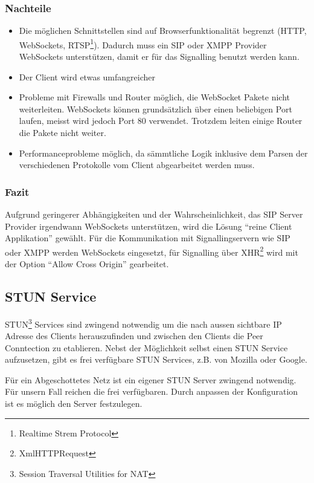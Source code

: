 		\subsubsection{Nachteile}
		\begin{itemize}
			\item Die möglichen Schnittstellen sind auf Browserfunktionalität begrenzt (HTTP, WebSockets, RTSP\footnote{Realtime Strem Protocol}). Dadurch muss ein SIP oder XMPP Provider WebSockets unterstützen, damit er für das Signalling benutzt werden kann.
			\item Der Client wird etwas umfangreicher
			\item Probleme mit Firewalls und Router möglich, die WebSocket Pakete nicht weiterleiten. WebSockets können grundsätzlich über einen beliebigen Port laufen, meisst wird jedoch Port 80 verwendet. Trotzdem leiten einige Router die Pakete nicht weiter.
			\item Performanceprobleme möglich, da sämmtliche Logik inklusive dem Parsen der verschiedenen Protokolle vom Client abgearbeitet werden muss.
		\end{itemize}

		\subsubsection{Fazit}
			Aufgrund geringerer Abhängigkeiten und der Wahrscheinlichkeit, das SIP Server Provider irgendwann WebSockets unterstützen, wird die Lösung ``reine Client Applikation'' gewählt.
			Für die Kommunikation mit Signallingservern wie SIP oder XMPP werden WebSockets eingesetzt, für Signalling über XHR\footnote{XmlHTTPRequest} wird mit der Option ``Allow Cross Origin'' gearbeitet.

	\subsection{STUN Service}
		STUN\footnote{Session Traversal Utilities for NAT} Services sind zwingend notwendig um die nach aussen sichtbare IP Adresse des Clients herauszufinden und zwischen den Clients die Peer Conntection zu etablieren. Nebst der Möglichkeit selbst einen STUN Service aufzusetzen, gibt es frei verfügbare STUN Services, z.B. von Mozilla oder Google.

		Für ein Abgeschottetes Netz ist ein eigener STUN Server zwingend notwendig. Für unsern Fall reichen die frei verfügbaren. Durch anpassen der Konfiguration ist es möglich den Server festzulegen.

